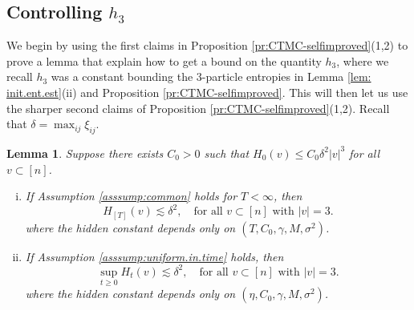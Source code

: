 \documentclass[11pt,reqno]{amsart}
\numberwithin{equation}{section}
\newtheorem{lemma}[theorem]{Lemma}
\theoremstyle{definition}
\begin{document}
\subsection{Controlling $h_3$}
We begin by using the first claims in Proposition \ref{pr:CTMC-selfimproved}(1,2) to prove a lemma that explain how to get a bound on the quantity $h_3$, where we recall $h_3$ was a constant bounding the 3-particle entropies in Lemma \ref{lem: init.ent.est}(ii) and Proposition \ref{pr:CTMC-selfimproved}. This will then let us use the sharper second claims of Proposition \ref{pr:CTMC-selfimproved}(1,2). Recall that $\delta=\max_{ij}\xi_{ij}$.




\begin{lemma} \label{le:selfimprovement-prep}
Suppose there exists $C_0 > 0$ such that $H_0(v) \le C_0\delta^2|v|^3$ for all $v \subset [n]$.
\begin{enumerate}[(i)]
\item If Assumption \ref{asssump:common} holds for $T < \infty$, then
\begin{equation*}
H_{[T]}(v)\lesssim \delta^2, \quad \text{for all } v\subset [n] \text{ with } |v|=3. 
\end{equation*}
where the hidden constant depends only on $(T,C_0,\gamma,M,\sigma^2)$.
\item If Assumption \ref{asssump:uniform.in.time} holds, then 
\begin{equation*}
\sup_{t \ge 0} H_t(v)\lesssim \delta^2, \quad \text{for all } v\subset [n] \text{ with } |v|=3.  
\end{equation*} 
where the hidden constant depends only on $(\eta,C_0,\gamma, M,\sigma^2)$. 
\end{enumerate} 
\end{lemma}
\end{document}

